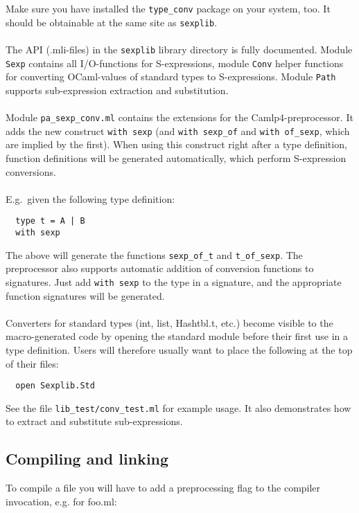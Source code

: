 \documentclass[a4paper]{article}
\begin{document}
Make sure you have installed the \verb=type_conv= package on your system,
too.  It should be obtainable at the same site as \verb=sexplib=.\\
\\
The API (.mli-files) in the \verb=sexplib= library directory is
fully documented.  Module \verb=Sexp= contains all I/O-functions for
S-expressions, module \verb=Conv= helper functions for converting
OCaml-values of standard types to S-expressions.  Module \verb=Path=
supports sub-expression extraction and substitution.\\
\\
Module \verb=pa_sexp_conv.ml= contains the extensions for the
Camlp4-preprocessor.  It adds the new construct \verb=with sexp=
(and \verb=with sexp_of= and \verb=with of_sexp=, which are implied by
the first).  When using this construct right after a type definition,
function definitions will be generated automatically, which perform
S-expression conversions.\\
\\
E.g.\ given the following type definition:

\begin{verbatim}
  type t = A | B
  with sexp
\end{verbatim}

The above will generate the functions \verb=sexp_of_t= and
\verb=t_of_sexp=.  The preprocessor also supports automatic addition
of conversion functions to signatures.  Just add \verb=with sexp= to
the type in a signature, and the appropriate function signatures will
be generated.\\
\\
Converters for standard types (int, list, Hashtbl.t, etc.) become visible to
the macro-generated code by opening the standard module before their first
use in a type definition.  Users will therefore usually want to place the
following at the top of their files:

\begin{verbatim}
  open Sexplib.Std
\end{verbatim}

See the file \verb=lib_test/conv_test.ml= for example usage.  It also
demonstrates how to extract and substitute sub-expressions.

\subsection{Compiling and linking}

To compile a file you will have to add a preprocessing flag to the
compiler invocation, e.g. for foo.ml:
\end{document}
